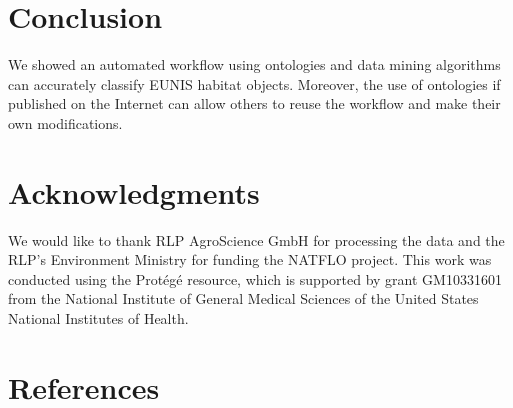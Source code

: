 \documentclass[authoryear, review,12pt,number]{elsarticle}
\begin{document}
\section{Conclusion} We showed an automated
workflow using ontologies and data mining algorithms can accurately classify
EUNIS habitat objects. Moreover, the use of ontologies if published on the
Internet can allow others to reuse the workflow and make their own
modifications. 
\section{Acknowledgments}
We would like to thank RLP AgroScience GmbH for processing the data and the
RLP's Environment Ministry for funding the  NATFLO project. This work was
conducted using the Prot\'eg\'e resource, which is supported by grant GM10331601 from the
National Institute of General Medical Sciences of the United States National
Institutes of Health.

\section{References}  
\end{document}
